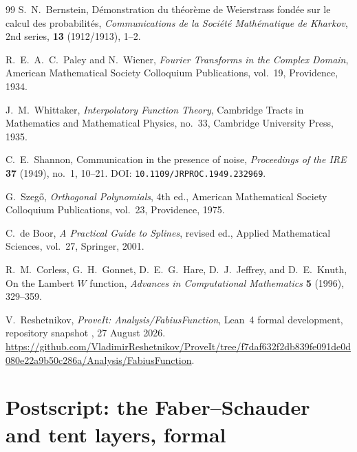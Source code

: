\documentclass[11pt]{article}
\theoremstyle{definition}
\theoremstyle{remark}
\begin{document}
\begin{thebibliography}{99}
S.~N.~Bernstein,
\newblock Démonstration du théorème de Weierstrass fondée sur le calcul des
  probabilités,
\newblock \emph{Communications de la Société Mathématique de Kharkov},
  2nd series, \textbf{13} (1912/1913), 1--2.

R.~E.~A.~C.~Paley and N.~Wiener,
\newblock \emph{Fourier Transforms in the Complex Domain},
\newblock American Mathematical Society Colloquium Publications, vol.~19,
  Providence, 1934.

J.~M.~Whittaker,
\newblock \emph{Interpolatory Function Theory},
\newblock Cambridge Tracts in Mathematics and Mathematical Physics, no.~33,
  Cambridge University Press, 1935.

C.~E.~Shannon,
\newblock Communication in the presence of noise,
\newblock \emph{Proceedings of the IRE} \textbf{37} (1949), no.~1, 10--21.
\newblock DOI: \nolinkurl{10.1109/JRPROC.1949.232969}.

G.~Szegő,
\newblock \emph{Orthogonal Polynomials}, 4th ed.,
\newblock American Mathematical Society Colloquium Publications, vol.~23,
  Providence, 1975.

C.~de Boor,
\newblock \emph{A Practical Guide to Splines}, revised ed.,
\newblock Applied Mathematical Sciences, vol.~27, Springer, 2001.

R.~M.~Corless, G.~H.~Gonnet, D.~E.~G.~Hare, D.~J.~Jeffrey, and D.~E.~Knuth,
\newblock On the Lambert $W$ function,
\newblock \emph{Advances in Computational Mathematics}
  \textbf{5} (1996), 329--359.

V.~Reshetnikov,
\newblock \emph{ProveIt: Analysis/FabiusFunction},
\newblock Lean~4 formal development, repository snapshot
, 27 August 2026.
\newblock \url{https://github.com/VladimirReshetnikov/ProveIt/tree/f7daf632f2db839fe091de0d080e22a9b50c286a/Analysis/FabiusFunction}.

\end{thebibliography}




\section*{Postscript: the Faber--Schauder and tent layers, formal}
\end{document}
